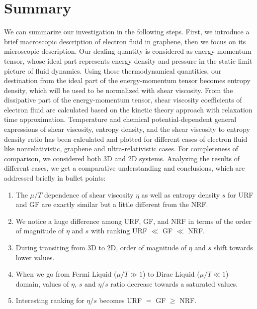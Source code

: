 \documentclass[%
 reprint,
 amsmath,amssymb,
 aps,
]{revtex4-2}
\begin{document}
    \section{Summary}
    \label{sec: Sum}
    We can summarize our investigation in the following steps. First, we introduce a brief macroscopic description of electron fluid in graphene, then we focus on its microscopic description. Our dealing quantity is considered as energy-momentum tensor, whose ideal part represents energy density and pressure in the static limit picture of fluid dynamics. Using those thermodynamical quantities, our destination from the ideal part of the energy-momentum tensor becomes entropy density, which will be used to be normalized with shear viscosity. From the dissipative part of the energy-momentum tensor, shear viscosity coefficients of electron fluid are calculated based on the kinetic theory approach with relaxation time approximation. Temperature and chemical potential-dependent general expressions of shear viscosity, entropy density, and the shear viscosity to entropy density ratio has been calculated and plotted for different cases of electron fluid like nonrelativistic, graphene and ultra-relativistic cases. For completeness of comparison, we considered both 3D and 2D systems. Analyzing the results of different cases, we get a comparative understanding and conclusions, which are addressed briefly in bullet points:
    \begin{enumerate}
    \item The $\mu/T$ dependence of shear viscosity $\eta$ as well as entropy density $s$ for URF and GF are exactly similar but a little different from the NRF.
    \item We notice a huge difference among URF, GF, and NRF in terms of the order of magnitude of $\eta$ and $s$ with ranking URF $\ll$ GF $\ll$ NRF.
    \item During transiting from 3D to 2D, order of magnitude of $\eta$ and $s$ shift towards lower values.
    \item When we go from Fermi Liquid ($\mu/T\gg 1$) to Dirac Liquid ($\mu/T\ll 1$) domain, values of $\eta$,
        $s$ and $\eta/s$ ratio decrease towards a saturated values.
    \item Interesting ranking for $\eta/s$ becomes URF $=$ GF $\ge$ NRF.
    \end{enumerate}
    
\end{document}
